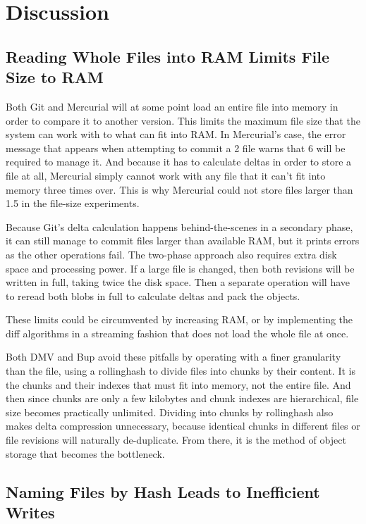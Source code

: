 \section{Discussion}

\subsection{Reading Whole Files into RAM Limits File Size to RAM}

Both Git and Mercurial will at some point load an entire file into memory in order to compare it to another version.
This limits the maximum file size that the system can work with to what can fit into RAM.
In Mercurial's case, the error message that appears when attempting to \gls{commit} a \SI{2}{\gib} file warns that \SI{6}{\gib} will be required to manage it.
And because it has to calculate deltas in order to store a file at all, Mercurial simply cannot work with any file that it can't fit into memory three times over.
This is why Mercurial could not store files larger than \SI{1.5}{\gib} in the file-size experiments.

Because Git's delta calculation happens behind-the-scenes in a secondary phase, it can still manage to \gls{commit} files larger than available RAM, but it prints errors as the other operations fail.
The two-phase approach also requires extra disk space and processing power.
If a large file is changed, then both revisions will be written in full, taking twice the disk space.
Then a separate operation will have to reread both \glspl{blob} in full to calculate deltas and pack the objects.

These limits could be circumvented by increasing RAM, or by implementing the diff algorithms in a streaming fashion that does not load the whole file at once.

Both \gls{DMV} and Bup avoid these pitfalls by operating with a finer granularity than the file, using a \gls{rollinghash} to divide files into chunks by their content.
It is the chunks and their indexes that must fit into memory, not the entire file.
And then since chunks are only a few kilobytes and chunk indexes are hierarchical, file size becomes practically unlimited.
Dividing into chunks by \gls{rollinghash} also makes delta compression unnecessary, because identical chunks in different files or file revisions will naturally de-duplicate.
From there, it is the method of object storage that becomes the bottleneck.


\subsection{Naming Files by Hash Leads to Inefficient Writes}

